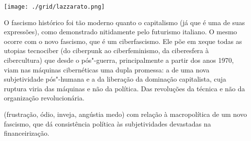 \pagebreak %


\begin{center}
\hspace*{-3.6cm}
\hspace*{3.1cm}\texttt{[image: ./grid/lazzarato.png]}
\end{center}

\hspace*{-7cm}\hrulefill\hspace*{-7cm}

\medskip

\noindent{}O fascismo histórico foi tão moderno quanto o capitalismo (já que é uma de suas expressões), como demonstrado nitidamente pelo futurismo italiano. O mesmo ocorre com o novo fascismo, que é um ciberfascismo. Ele põe em xeque todas as utopias tecnociber (do ciberpunk ao ciberfeminismo, da ciberesfera à cibercultura) que desde o pós"-guerra, principalmente a partir dos anos 1970, viam nas máquinas cibernéticas uma dupla promessa: a de uma nova subjetividade pós"-humana e a da liberação da dominação capitalista, cuja ruptura viria das máquinas e não da política. Das revoluções da técnica e não da organização revolucionária.

 (frustração, ódio, inveja, angústia medo) com relação à macropolítica de um novo fascismo, que dá consistência política às subjetividades devastadas na financeirização.

\vfill

\hspace*{-.4cm}\begin{minipage}[c]{.5\linewidth}
\small{
{}}
\end{minipage}

